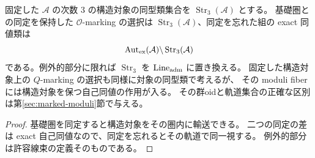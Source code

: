 \begin{theorem}[固定圏における構造対象の選択と同値類]
\label{thm:forgetful-fibres}
固定した $\mathcal A$ の次数 $3$ の構造対象の同型類集合を
$\operatorname{Str}_3(\mathcal A)$ とする。
基礎圏との同定を保持した $\mathcal O$-marking の選択は
$\operatorname{Str}_3(\mathcal A)$、同定を忘れた組の exact 同値類は
\[
 \operatorname{Aut}_{\rm ex}(\mathcal A)\backslash
 \operatorname{Str}_3(\mathcal A)
\]
である。例外的部分に限れば $\operatorname{Str}_3$ を
$\operatorname{Line}_{\rm adm}$ に置き換える。
固定した構造対象上の $Q$-marking の選択も同様に対象の同型類で考えるが、
その moduli fiber には構造対象を保つ自己同値の作用が入る。
その群oidと軌道集合の正確な区別は第\ref{sec:marked-moduli}節で与える。
\end{theorem}
\begin{proof}
基礎圏を同定すると構造対象をその圏内に輸送できる。
二つの同定の差は exact 自己同値なので、同定を忘れるとその軌道で同一視する。
例外的部分は許容線束の定義そのものである。
\end{proof}
